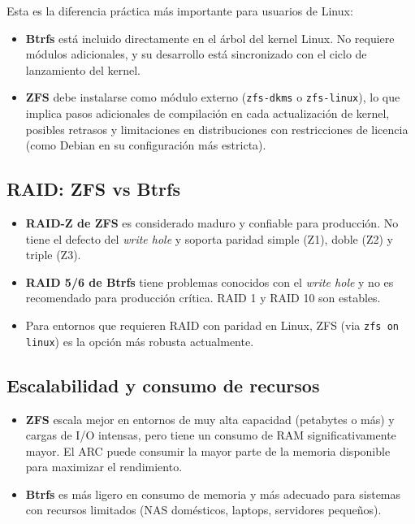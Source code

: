 \documentclass[12pt,letterpaper]{article}
\begin{document}
Esta es la diferencia práctica más importante para usuarios de Linux:

\begin{itemize}
\item \textbf{Btrfs} está incluido directamente en el árbol del kernel Linux. No requiere módulos adicionales, y
  su desarrollo está sincronizado con el ciclo de lanzamiento del kernel.
\item \textbf{ZFS} debe instalarse como módulo externo (\texttt{zfs-dkms} o \texttt{zfs-linux}), lo que implica
  pasos adicionales de compilación en cada actualización de kernel, posibles retrasos y limitaciones en
  distribuciones con restricciones de licencia (como Debian en su configuración más estricta).
\end{itemize}

\subsection{RAID: ZFS vs Btrfs}

\begin{itemize}
\item \textbf{RAID-Z de ZFS} es considerado maduro y confiable para producción. No tiene el defecto del \emph{write hole} y soporta paridad simple (Z1), doble (Z2) y triple (Z3).
\item \textbf{RAID 5/6 de Btrfs} tiene problemas conocidos con el \emph{write hole} y no es recomendado para producción crítica. RAID 1 y RAID 10 son estables.
\item Para entornos que requieren RAID con paridad en Linux, ZFS (via \texttt{zfs on linux}) es la opción más robusta actualmente.
\end{itemize}

\subsection{Escalabilidad y consumo de recursos}

\begin{itemize}
\item \textbf{ZFS} escala mejor en entornos de muy alta capacidad (petabytes o más) y cargas de I/O intensas,
  pero tiene un consumo de RAM significativamente mayor. El ARC puede consumir la mayor parte de la memoria
  disponible para maximizar el rendimiento.
\item \textbf{Btrfs} es más ligero en consumo de memoria y más adecuado para sistemas con recursos limitados
  (NAS domésticos, laptops, servidores pequeños).
\end{itemize}
\end{document}
